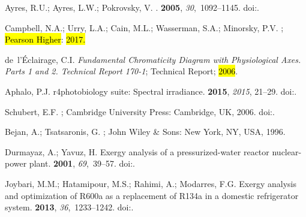 \documentclass[energies,article,accept,moreauthors,pdftex]{Definitions/mdpi}\usepackage[]{graphicx}\usepackage[]{color}
\begin{document}
\begin{thebibliography}{999}
Ayres, R.U.; Ayres, L.W.; Pokrovsky, V.
.
 {\bf 2005}, {\em 30},~1092--1145.
\newblock
  doi:{\href{https://doi.org/10.1016/j.energy.2004.07.012}{}}.%

Campbell, N.A.; Urry, L.A.; Cain, M.L.; Wasserman, S.A.; Minorsky, P.V.
; \hl{Pearson Higher}:  \hl{2017.} %


de~l'{\'E}clairage, C.I.
\newblock \emph{Fundamental Chromaticity Diagram with Physiological Axes. Parts 1 and
  2. Technical Report 170-1};
\newblock Technical Report;  \hl{2006}.%

Aphalo, P.J.
\newblock r4photobiology suite: Spectral irradiance.
 {\bf 2015}, \emph{2015}, 21--29.
\newblock
  doi:{\href{https://doi.org/10.19232/uv4pb.2015.1.14}{}}.%

Schubert, E.F.
; Cambridge University Press: Cambridge,
  UK,  2006.
\newblock
  doi:{\href{https://doi.org/10.1017/CBO9780511790546}{}}.%


Bejan, A.; Tsatsaronis, G.
; John Wiley \& Sons: New York, NY, USA,
  1996.%

Durmayaz, A.; Yavuz, H.
\newblock Exergy analysis of a pressurized-water reactor nuclear-power plant.
 {\bf 2001}, {\em 69},~39--57.
\newblock
  doi:{\href{https://doi.org/10.1016/s0306-2619(00)00071-4}{}}.%

Joybari, M.M.; Hatamipour, M.S.; Rahimi, A.; Modarres, F.G.
\newblock Exergy analysis and optimization of {R600a} as a replacement of
  {R134a} in a domestic refrigerator system.
 {\bf 2013}, {\em
  36},~1233--1242.
\newblock
  doi:{\href{https://doi.org/10.1016/j.ijrefrig.2013.02.012}{}}.%


\end{thebibliography}
\end{document}
